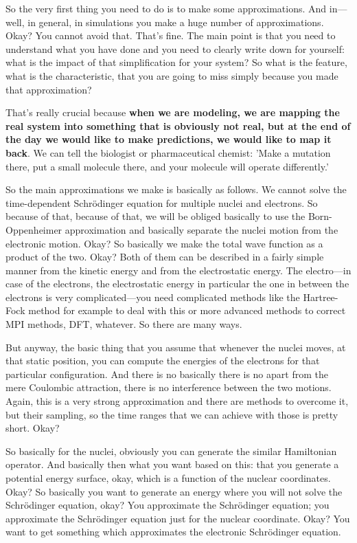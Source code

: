 So the very first thing you need to do is to make some approximations. And in—well, in general, in simulations you make a huge number of approximations. Okay? You cannot avoid that. That's fine. The main point is that you need to understand what you have done and you need to clearly write down for yourself: what is the impact of that simplification for your system? So what is the feature, what is the characteristic, that you are going to miss simply because you made that approximation? 

That's really crucial because \textbf{when we are modeling, we are mapping the real system into something that is obviously not real, but at the end of the day we would like to make predictions, we would like to map it back}. We can tell the biologist or pharmaceutical chemist: 'Make a mutation there, put a small molecule there, and your molecule will operate differently.' 

So the main approximations we make is basically as follows. We cannot solve the time-dependent Schrödinger equation for multiple nuclei and electrons. So because of that, because of that, we will be obliged basically to use the Born-Oppenheimer approximation and basically separate the nuclei motion from the electronic motion. Okay? So basically we make the total wave function as a product of the two. Okay? Both of them can be described in a fairly simple manner from the kinetic energy and from the electrostatic energy. The electro—in case of the electrons, the electrostatic energy in particular the one in between the electrons is very complicated—you need complicated methods like the Hartree-Fock method for example to deal with this or more advanced methods to correct MPI methods, DFT, whatever. So there are many ways. 

But anyway, the basic thing that you assume that whenever the nuclei moves, at that static position, you can compute the energies of the electrons for that particular configuration. And there is no basically there is no apart from the mere Coulombic attraction, there is no interference between the two motions. Again, this is a very strong approximation and there are methods to overcome it, but their sampling, so the time ranges that we can achieve with those is pretty short. Okay? 

So basically for the nuclei, obviously you can generate the similar Hamiltonian operator. And basically then what you want based on this: that you generate a potential energy surface, okay, which is a function of the nuclear coordinates. Okay? So basically you want to generate an energy where you will not solve the Schrödinger equation, okay? You approximate the Schrödinger equation; you approximate the Schrödinger equation just for the nuclear coordinate. Okay? You want to get something which approximates the electronic Schrödinger equation. 

